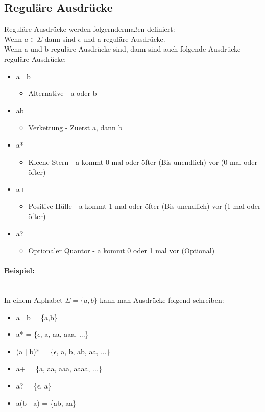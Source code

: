 \documentclass{article}
\newcommand{\paragraphlb}[1]{\paragraph{#1}\mbox{}\\}
\begin{document}
	\subsection{Reguläre Ausdrücke}
	Reguläre Ausdrücke werden folgerndermaßen definiert: \\
	Wenn $a \in \Sigma$ dann sind $\epsilon$ und a reguläre Ausdrücke.\\
	Wenn a und b reguläre Ausdrücke sind, dann sind auch folgende Ausdrücke reguläre Ausdrücke:
	\begin{itemize}
		\item{a | b}
		\begin{itemize}
			\item{Alternative - a oder b}
		\end{itemize}
		\item{ab}
		\begin{itemize}
			\item{Verkettung - Zuerst a, dann b}
		\end{itemize}
		\item{a*}
		\begin{itemize}
			\item{Kleene Stern - a kommt 0 mal oder öfter (Bis unendlich) vor (0 mal oder öfter)}
		\end{itemize}
		\item{a+}
		\begin{itemize}
			\item{Positive Hülle - a kommt 1 mal oder öfter (Bis unendlich) vor (1 mal oder öfter)}
		\end{itemize}
		\item{a?}
		\begin{itemize}
			\item{Optionaler Quantor - a kommt 0 oder 1 mal vor (Optional)}
		\end{itemize}
	\end{itemize}
	\paragraphlb{Beispiel:}
	In einem Alphabet $\Sigma = \{a,b\}$ kann man Ausdrücke folgend schreiben:
	\begin{itemize}
		\item{a | b = \{a,b\}}
		\item{a* = \{$\epsilon$, a, aa, aaa, ...\}}
		\item{(a | b)* = \{$\epsilon$, a, b, ab, aa, ...\}}
		\item{a+ = \{a, aa, aaa, aaaa, ...\}}
		\item{a? = \{$\epsilon$, a\}}
		\item{a(b | a) = \{ab, aa\}}
	\end{itemize}
\end{document}
